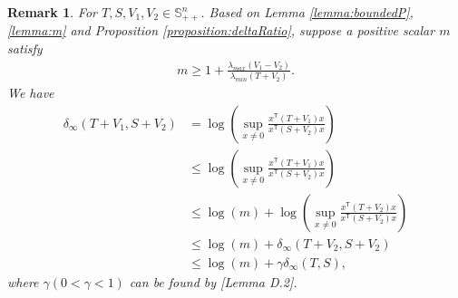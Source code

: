 \documentclass{article}
\newcommand{\transpose}{\mathsf{T}}
\newcommand{\quadinner}[1]{x^{\transpose}(#1)x}
\newtheorem{remark}{Remark}
\begin{document}
\begin{remark}\label{remark:delta}
    For $T,S,V_{1},V_{2}\in \mathbb{S}_{++}^{n}$. Based on Lemma \ref{lemma:boundedP},\ref{lemma:m} and Proposition \ref{proposition:deltaRatio}, suppose a positive scalar $m$ satisfy
    \begin{align*}
        m \geq 1+\frac{\lambda_{max}(V_{1}-V_{2})}{\lambda_{min}(T+V_{2})}.
    \end{align*}
    We have
    \begin{align*}
        \delta_{\infty}(T+V_{1},S+V_{2}) &= \log( \sup_{x\neq 0} \frac{\quadinner{T+V_{1}}}{\quadinner{S+V_{2}}})\\
        &\leq \log(\sup_{x\neq 0} \frac{\quadinner{T+V_{1}}}{\quadinner{S+V_{2}}})\\
        &\leq \log(m)+\log(\sup_{x\neq 0} \frac{\quadinner{T+V_{2}}}{\quadinner{S+V_{2}}})\\
        &\leq \log(m) + \delta_{\infty}(T+V_{2},S+V_{2})\\
        &\leq \log(m) + \gamma\delta_{\infty}(T,S),
    \end{align*}
    where $\gamma(0<\gamma<1)$ can be found by \cite{krauth_finite-time_2019}[Lemma D.2].
\end{remark}
\end{document}
